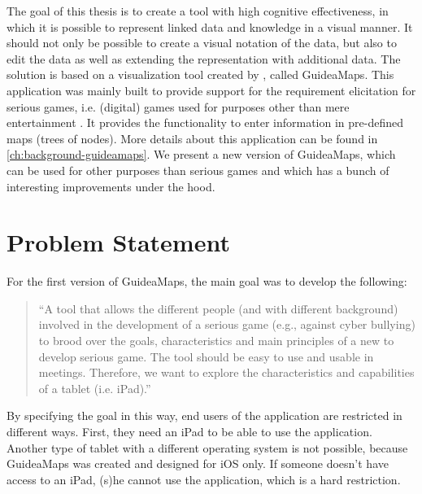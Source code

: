The goal of this thesis is to create a tool with high cognitive effectiveness, in which it is possible to represent linked data and knowledge in a visual manner. It should not only be possible to create a visual notation of the data, but also to edit the data as well as extending the representation with additional data. The solution is based on a visualization tool created by \cite{erikjanssens}, called GuideaMaps. This application was mainly built to provide support for the requirement elicitation for serious games, i.e. (digital) games used for purposes other than mere entertainment \citep{susi2007serious}. It provides the functionality to enter information in pre-defined maps (trees of nodes). More details about this application can be found in \autoref{ch:background-guideamaps}. We present a new version of GuideaMaps, which can be used for other purposes than serious games and which has a bunch of interesting improvements under the hood.





\section{Problem Statement}\label{sec:problem-statement}
For the first version of GuideaMaps, the main goal was to develop the following:

\begin{quote}
``A tool that allows the different people (and with different background) involved in the development of a serious game (e.g., against cyber bullying) to brood over the goals, characteristics and main principles of a new to develop serious game. The tool should be easy to use and usable in meetings. Therefore, we want to explore the characteristics and capabilities of a tablet (i.e. iPad).'' \hfill \citep{erikjanssens}\\
\end{quote}

By specifying the goal in this way, end users of the application are restricted in different ways. First, they need an iPad to be able to use the application. Another type of tablet with a different operating system is not possible, because GuideaMaps was created and designed for iOS only. If someone doesn't have access to an iPad, (s)he cannot use the application, which is a hard restriction.\\

